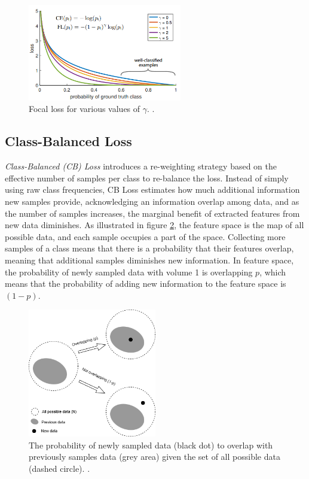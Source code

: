 \begin{figure}[h!]
    \centering
    \includegraphics[width=0.6\textwidth]{Images/focal_loss.png}
    \caption{Focal loss for various values of $\gamma$. \cite{lin2018focallossdenseobject}.}
    \label{fig:focal_loss}
\end{figure}

\subsection{Class-Balanced Loss}
\label{sec:cb_loss}
\emph{Class-Balanced (CB) Loss} \cite{cui2019classbalancedlossbasedeffective} introduces a re-weighting strategy based on the effective number of samples per class to re-balance the loss. Instead of simply using raw class frequencies, CB Loss estimates how much additional information new samples provide, acknowledging an information overlap among data, and as the number of samples increases, the marginal benefit of extracted features from new data diminishes. As illustrated in figure \ref{fig:cb_featue_space}, the feature space is the map of all possible data, and each sample occupies a part of the space. Collecting more samples of a class means that there is a probability that their features overlap, meaning that additional samples diminishes new information.
In feature space, the probability of newly sampled data with volume 1 is overlapping $p$, which means that the probability of adding new information to the feature space is $(1-p)$. 


\begin{figure}[h!]
    \centering
    \includegraphics[width=0.5\textwidth]{Images/featurespace.drawio.png}
    \caption{The probability of newly sampled data (black dot) to overlap with previously samples data (grey area) given the set of all possible data (dashed circle). \cite{cui2019classbalancedlossbasedeffective}.}
    \label{fig:cb_featue_space}
\end{figure}

